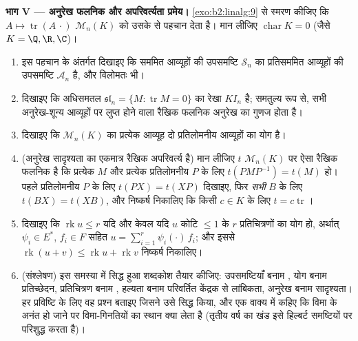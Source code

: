 \begin{problem}[{सप्ताहांत समस्या --- परिमित विमा में द्वैतता
और फ्रेडहोम विकल्प}]
\medskip
\noindent\textbf{भाग V --- अनुरेख फलनिक और अपरिवर्त्यता प्रमेय।}
\cref{exo:b2:linalg:9} से स्मरण कीजिए कि $A \mapsto
\operatorname{tr}(A\,\cdot)$ $\mathcal{M}_n(K)$ को उसके  से पहचान देता है। मान
लीजिए $\operatorname{char} K = 0$ (जैसे $K = \Q, \R,
\C$)।
\begin{enumerate}[resume]
  \item इस पहचान के अंतर्गत दिखाइए कि सममित आव्यूहों की उपसमष्टि $\mathcal{S}_n$
        का  प्रतिसममित आव्यूहों की उपसमष्टि $\mathcal{A}_n$ है, और विलोमतः
        भी।
  \item दिखाइए कि अधिसमतल $\mathfrak{sl}_n = \{M : \operatorname{tr} M = 0\}$ का  रेखा $K I_n$ है; समतुल्य रूप से,
        सभी अनुरेख-शून्य आव्यूहों पर लुप्त होने वाला रैखिक फलनिक
        अनुरेख का गुणज होता है।
  \item दिखाइए कि $\mathcal{M}_n(K)$ का प्रत्येक आव्यूह दो प्रतिलोमनीय आव्यूहों का
        योग है।
  \item (अनुरेख सादृश्यता का एकमात्र रैखिक अपरिवर्त्य है) मान लीजिए
        $t$ $\mathcal{M}_n(K)$ पर ऐसा रैखिक फलनिक है कि प्रत्येक $M$ और प्रत्येक
        प्रतिलोमनीय $P$ के लिए $t(PMP^{-1}) = t(M)$ हो। पहले प्रतिलोमनीय $P$ के लिए
        $t(PX) = t(XP)$ दिखाइए, फिर \emph{सभी} $B$ के लिए $t(BX) = t(XB)$, और निष्कर्ष
        निकालिए कि किसी $c \in K$ के लिए $t = c
        \operatorname{tr}$।
  \item दिखाइए कि $\operatorname{rk} u \leq r$ यदि और केवल यदि $u$ कोटि $\leq 1$ के $r$
        प्रतिचित्रणों का योग हो, अर्थात् $\psi_i \in E^*$, $f_i \in F$ सहित $u =
        \sum_{i=1}^{r} \psi_i(\cdot)\,f_i$; और
        इससे $\operatorname{rk}(u + v) \leq
        \operatorname{rk} u + \operatorname{rk} v$ निष्कर्ष निकालिए।
  \item (संश्लेषण) इस समस्या में सिद्ध हुआ शब्दकोश तैयार कीजिए:
        उपसमष्टियाँ बनाम , योग बनाम प्रतिच्छेदन, प्रतिचित्रण
        बनाम , हल्यता बनाम परिवर्तित केंद्रक से लांबिकता,
        अनुरेख बनाम सादृश्यता। हर प्रविष्टि के लिए वह प्रश्न बताइए
        जिसने उसे सिद्ध किया, और एक वाक्य में कहिए कि विमा के अनंत हो
        जाने पर विमा-गिनतियों का स्थान क्या लेता है (तृतीय वर्ष का खंड
        इसे हिल्बर्ट समष्टियों पर परिशुद्ध करता है)।
\end{enumerate}
\end{problem}

